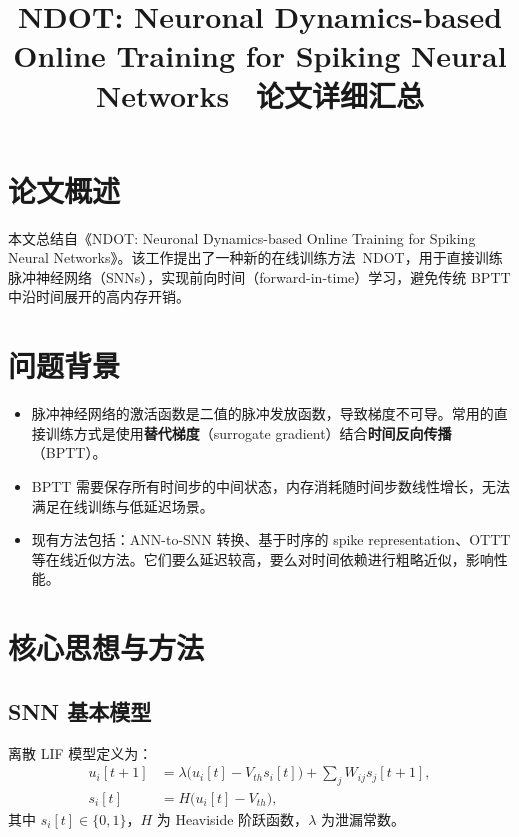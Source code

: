 \documentclass[journal,12pt,onecolumn]{IEEEtran}
\begin{document}
\title{NDOT: Neuronal Dynamics-based Online Training for Spiking Neural Networks \ 论文详细汇总}
\author{}
\date{}
\maketitle

\section{论文概述}
本文总结自《NDOT: Neuronal Dynamics-based Online Training for Spiking Neural Networks》\cite{jiang2024ndot}。该工作提出了一种新的在线训练方法\ NDOT，用于直接训练脉冲神经网络（SNNs），实现前向时间（forward-in-time）学习，避免传统 BPTT 中沿时间展开的高内存开销。

\section{问题背景}
\begin{itemize}[leftmargin=*]
  \item 脉冲神经网络的激活函数是二值的脉冲发放函数，导致梯度不可导。常用的直接训练方式是使用\textbf{替代梯度}（surrogate gradient）结合\textbf{时间反向传播}（BPTT）。
  \item BPTT 需要保存所有时间步的中间状态，内存消耗随时间步数线性增长，无法满足在线训练与低延迟场景。
  \item 现有方法包括：ANN-to-SNN 转换、基于时序的 spike representation、OTTT 等在线近似方法。它们要么延迟较高，要么对时间依赖进行粗略近似，影响性能。
\end{itemize}

\section{核心思想与方法}
\subsection{SNN 基本模型}
离散 LIF 模型定义为：
\begin{align}
  u_i[t+1] &= \lambda\bigl(u_i[t]-V_{th}s_i[t]\bigr) + \sum_j W_{ij}s_j[t+1], \\
  s_i[t] &= H\bigl(u_i[t]-V_{th}\bigr),
\end{align}
其中 $s_i[t]\in\{0,1\}$，$H$ 为 Heaviside 阶跃函数，$\lambda$ 为泄漏常数。
\end{document}
